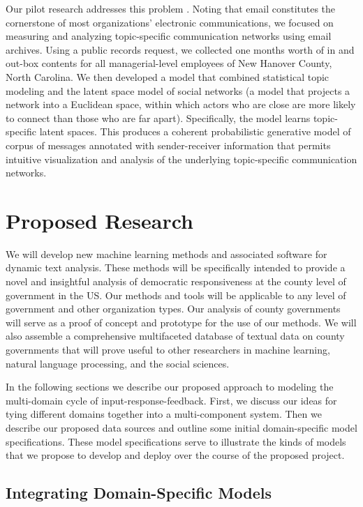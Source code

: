 Our pilot research addresses this problem \cite{Krafft2012}. Noting that email constitutes the cornerstone of most organizations' electronic communications, we focused on measuring and analyzing topic-specific communication networks using email archives. Using a public records request, we collected one months worth of in and out-box contents for all managerial-level employees of New Hanover County, North Carolina. We then developed a model that combined statistical topic modeling and the latent space model of social networks (a model that projects a network into a Euclidean space, within which actors who are close are more likely to connect than those who are far apart). Specifically, the model learns topic-specific latent spaces. This produces a coherent probabilistic generative model of corpus of messages annotated with sender-receiver information that permits intuitive visualization and analysis of the underlying topic-specific communication networks.

\section{Proposed Research}

We will develop new machine learning methods and associated software
for dynamic text analysis. These methods will be specifically intended
to provide a novel and insightful analysis of democratic
responsiveness at the county level of government in the US. Our
methods and tools will be applicable to any level of government and
other organization types. Our analysis of county governments will
serve as a proof of concept and prototype for the use of our
methods. We will also assemble a comprehensive multifaceted database
of textual data on county governments that will prove useful to other
researchers in machine learning, natural language processing, and the
social sciences.

In the following sections we describe our proposed approach to
modeling the multi-domain cycle of input-response-feedback. First, we
discuss our ideas for tying different domains together into a
multi-component system. Then we describe our proposed data sources and
outline some initial domain-specific model specifications. These model
specifications serve to illustrate the kinds of models that we propose
to develop and deploy over the course of the proposed project.

\subsection{Integrating Domain-Specific Models}


